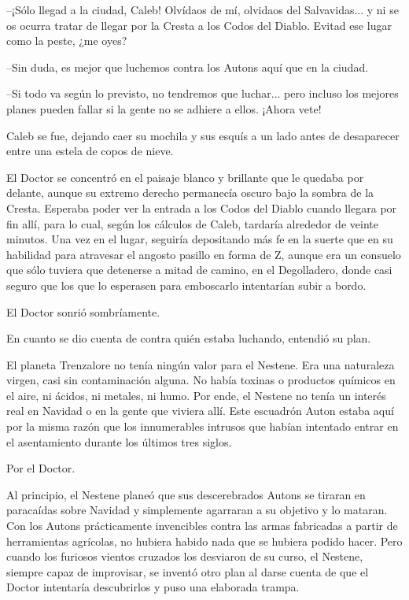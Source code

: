 --¡Sólo llegad a la ciudad, Caleb! Olvídaos de mí, olvidaos del Salvavidas... y ni se os ocurra tratar de llegar por la Cresta a los Codos del Diablo. Evitad ese lugar como la peste, ¿me oyes?
 
--Sin duda, es mejor que luchemos contra los Autons aquí que en la ciudad.
 
--Si todo va según lo previsto, no tendremos que luchar... pero incluso los mejores planes pueden fallar si la gente no se adhiere a ellos. ¡Ahora vete!
 
Caleb se fue, dejando caer su mochila y sus esquís a un lado antes de desaparecer entre una estela de copos de nieve.
 
El Doctor se concentró en el paisaje blanco y brillante que le quedaba por delante, aunque su extremo derecho permanecía oscuro bajo la sombra de la Cresta. Esperaba poder ver la entrada a los Codos del Diablo cuando llegara por fin allí, para lo cual, según los cálculos de Caleb, tardaría alrededor de veinte minutos. Una vez en el lugar, seguiría depositando más fe en la suerte que en su habilidad para atravesar el angosto pasillo en forma de Z, aunque era un consuelo que sólo tuviera que detenerse a mitad de camino, en el Degolladero, donde casi seguro que los que lo esperasen para emboscarlo intentarían subir a bordo.
 
El Doctor sonrió sombríamente.
 
En cuanto se dio cuenta de contra quién estaba luchando, entendió su plan.
 
El planeta Trenzalore no tenía ningún valor para el Nestene. Era una naturaleza virgen, casi sin contaminación alguna. No había toxinas o productos químicos en el aire, ni ácidos, ni metales, ni humo. Por ende, el Nestene no tenía un interés real en Navidad o en la gente que viviera allí. Este escuadrón Auton estaba aquí por la misma razón que los innumerables intrusos que habían intentado entrar en el asentamiento durante los últimos tres siglos.
 
Por el Doctor.
 
Al principio, el Nestene planeó que sus descerebrados Autons se tiraran en paracaídas sobre Navidad y simplemente agarraran a su objetivo y lo mataran. Con los Autons prácticamente invencibles contra las armas fabricadas a partir de herramientas agrícolas, no hubiera habido nada que se hubiera podido hacer. Pero cuando los furiosos vientos cruzados los desviaron de su curso, el Nestene, siempre capaz de improvisar, se inventó otro plan al darse cuenta de que el Doctor intentaría descubrirlos y puso una elaborada trampa.
 

